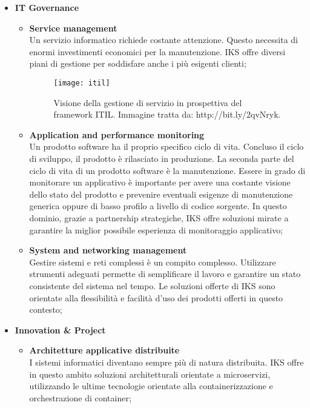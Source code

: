 \begin{itemize}
\begin{itemize}
	 
 	\end{itemize} 
	\item \textbf{IT Governance}\\
	\begin{itemize}
		\item \textbf{Service management}\\
		Un servizio informatico richiede costante attenzione. Questo necessita di enormi investimenti 
		economici per la manutenzione. IKS offre diversi piani di gestione per soddisfare anche i più 
		esigenti clienti;
	    
	    \begin{figure}[htbp]
	    	\begin{center}
	    		\texttt{[image: itil]}
	    		\caption{Visione della gestione di servizio in prospettiva del \gls{framework} ITIL. Immagine tratta da: http://bit.ly/2qvNryk.}
	    	\end{center}
	    \end{figure}
	    
	    \newpage  
		\item \textbf{Application and performance monitoring}\\ 
		Un prodotto software ha il proprio specifico ciclo di vita. Concluso il ciclo di sviluppo, 
		il prodotto è rilasciato in produzione. La seconda parte del ciclo di vita di un prodotto 
		software è la manutenzione. Essere in grado di monitorare un applicativo è importante per 
		avere una costante visione dello stato del prodotto e prevenire eventuali esigenze di 
		manutenzione generica oppure di basso profilo a livello di codice sorgente. In questo 
		dominio, grazie a partnership strategiche, IKS offre soluzioni mirate a garantire la miglior 
	    possibile esperienza di monitoraggio applicativo;
	
	
		\item \textbf{System and networking management}\\
		Gestire sistemi e reti complessi è un compito complesso. Utilizzare strumenti adeguati 
		permette di semplificare il lavoro e garantire un stato consistente del sistema nel tempo. Le 
		soluzioni offerte di IKS sono orientate alla flessibilità e facilità d'uso dei prodotti 
		offerti in questo contesto;
	\end{itemize} 
	\item \textbf{Innovation \& Project} \\
	\begin{itemize}
		\item \textbf{Architetture applicative distribuite}\\
		I sistemi informatici diventano sempre più di natura distribuita. IKS offre in questo 
		ambito soluzioni architetturali orientate a microservizi, utilizzando le ultime 
		tecnologie orientate alla containerizzazione e orchestrazione di container; 
	

\end{itemize}
\end{itemize}
